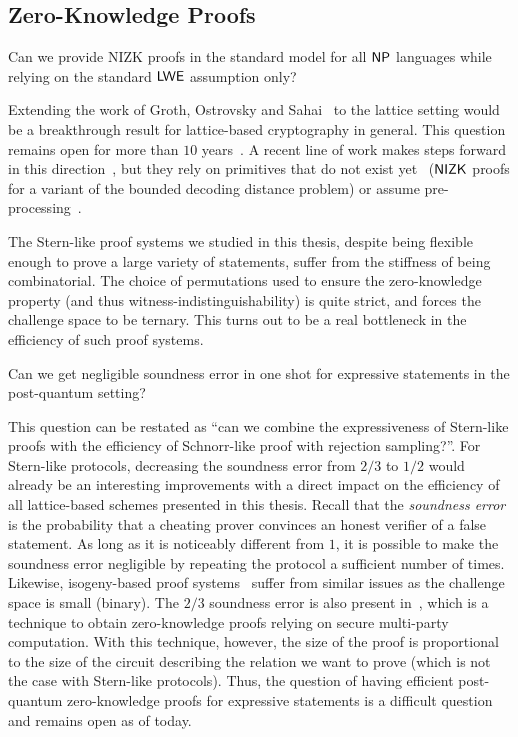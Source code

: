 \subsection*{Zero-Knowledge Proofs}

\begin{question}
  Can we provide NIZK proofs in the standard model for all $\textsf{NP}$ languages while relying on the standard $\mathsf{LWE}$ assumption only?
\end{question}

Extending the work of Groth, Ostrovsky and Sahai~\cite{GOS06} to the lattice setting would be a breakthrough result for lattice-based cryptography in general.
This question remains open for more than $10$ years~\cite{PV08}.
A recent line of work makes steps forward in this direction~\cite{KW18,RSS18}, but they rely on primitives that do not exist yet~\cite{RSS18} ($\textsf{NIZK}$ proofs for a variant of the bounded decoding distance problem) or assume pre-processing~\cite{KW18}.

The Stern-like proof systems we studied in this thesis, despite being flexible enough to prove a large variety of statements, suffer from the stiffness of being combinatorial.
The choice of permutations used to ensure the zero-knowledge property (and thus witness-indistinguishability) is quite strict, and forces the challenge space to be ternary.
This turns out to be a real bottleneck in the efficiency of such proof systems.

\begin{question}
  Can we get negligible soundness error in one shot for expressive statements in the post-quantum setting?
\end{question}

This question can be restated as ``can we combine the expressiveness of Stern-like proofs with the efficiency of Schnorr-like proof with rejection sampling?''.
For Stern-like protocols, decreasing the soundness error from $2/3$ to $1/2$ would already be an interesting improvements with a direct impact on the efficiency of all lattice-based schemes presented in this thesis.
Recall that the \textit{soundness error} is the probability that a cheating prover convinces an honest verifier of a false statement. As long as it is noticeably different from $1$, it is possible to make the soundness error negligible by repeating the protocol a sufficient number of times.
Likewise, isogeny-based proof systems~\cite{JDF11,GPS17} suffer from similar issues as the challenge space is small (binary).
The $2/3$ soundness error is also present in~\cite{IKOS07},
which is a technique to obtain zero-knowledge proofs relying on secure multi-party computation.
With this technique, however, the size of the proof is proportional to the size of the circuit describing the relation we want to prove (which is not the case with Stern-like protocols).
Thus, the question of having efficient post-quantum zero-knowledge proofs for expressive statements is a difficult question and remains open as of today.


